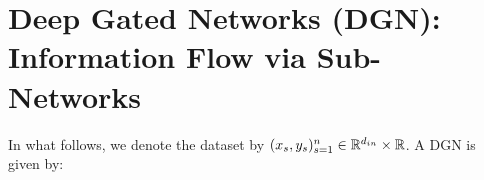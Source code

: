 \section{Deep Gated Networks (DGN): Information Flow via Sub-Networks}\label{sec:pathgate}
In what follows, we denote the dataset by $(x_s,y_s)_{s=1}^n\in\mathbb{R}^{d_{in}}\times \mathbb{R}$. A DGN is given by:
\FloatBarrier
\begin{table}[h]
\begin{minipage}{0.5\columnwidth}
\end{minipage}
\begin{minipage}{0.5\columnwidth}
\end{minipage}
\caption{Here $\Theta(l,i,j)$ denotes the weight connecting node $i$ of layer $l-1$ to node $j$ of layer $l$, and $\odot$ stands for the \emph{Hadamard} product. $q(l),z(l)$ and $G(l)$ are $w$-dimensional quantities. The left table shows the value network, and the right table shows the gating network.  At time $t$, by specifying the gating values for all the $n$ input examples as $\G_t\stackrel{def}=\{G_{x_{s},t}(l,i), \forall s\in[n],l\in[d-1],i\in[w]\}$, we can recover the outputs $\hat{y}_t(x_s)\in \R$ for all the inputs $\{x_s\}_{s=1}^n$ in the dataset. We denote a DNG by $\N(\Theta_t;\G(\Tg_t,\beta)$ or simply $\N(\Theta_t;\Tg_t,\beta)$.}
\label{tb:dgn}
\end{table}
